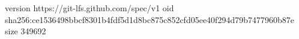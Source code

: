 version https://git-lfs.github.com/spec/v1
oid sha256:ce1536498bbcf8301b4fdf5d1d8bc875c852cfd05ee40f294d79b7477960b87e
size 349692
